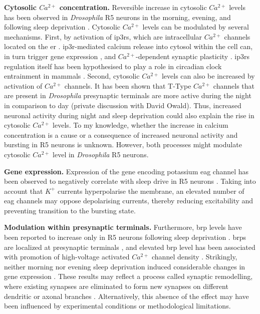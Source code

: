 \documentclass[../main.tex]{subfiles}
\begin{document}
\textbf{Cytosolic $Ca^{2+}$ concentration.}
Reversible increase in cytosolic $Ca^{2+}$ levels has been observed in \textit{Drosophila} R5 neurons in the morning, evening, and following sleep deprivation \cite{andreaniCircadianProgrammingEllipsoid2022,liuSleepDriveEncoded2016}. Cytosolic $Ca^{2+}$ levels can be modulated by several mechanisms. First, by activation of \glspl{ip3r}, which are intracellular $Ca^{2+}$ channels located on the \gls{er} \cite{schmitzStructuralBasisActivation2022}. \gls{ip3r}-mediated calcium release into cytosol within the cell can, in turn trigger gene expression \cite{schmitzStructuralBasisActivation2022}, and $Ca^{2+}$-dependent synaptic plasticity \cite{liuSleepDriveEncoded2016}. \glspl{ip3r} regulation itself has been hypothesised to play a role in circadian clock entrainment in mammals \cite{hamadaRoleInositolTrisphosphateinduced1999}. Second, cytosolic $Ca^{2+}$ levels can also be increased by activation of $Ca^{2+}$ channels. It has been shown that T-Type $Ca^{2+}$ channels that are present in \textit{Drosophila} presynaptic terminals are more active during the night in comparison to day (private discussion with David Owald).
Thus, increased neuronal activity during night and sleep deprivation could also explain the rise in cytosolic $Ca^{2+}$ levels. To my knowledge, whether the increase in calcium concentration is a cause or a consequence of increased neuronal activity and bursting in R5 neurons is unknown. However, both processes might modulate cytosolic $Ca^{2+}$ level in \textit{Drosophila} R5 neurons.

\textbf{Gene expression.}
Expression of the gene encoding potassium \gls{eag} channel has been observed to negatively correlate with sleep drive in R5 neurons \cite{doppSinglecellTranscriptomicsReveals2024}. Taking into account that $K^{+}$ currents hyperpolarise the membrane, an elevated number of \gls{eag} channels may oppose depolarising currents, thereby reducing excitability and preventing transition to the bursting state.

\textbf{Modulation within presynaptic terminals.}
Furthermore, \gls{brp} levels have been reported to increase only in R5 neurons following sleep deprivation \cite{liuSleepDriveEncoded2016}. \glspl{brp} are localized at presynaptic terminals \cite{waghBruchpilotProteinHomology2006}, and elevated \gls{brp} level has been associated with promotion of high-voltage activated $Ca^{2+}$ channel density \cite{kittelBruchpilotPromotesActive2006}. Strikingly, neither morning nor evening sleep deprivation induced considerable changes in gene expression \cite{andreaniCircadianProgrammingEllipsoid2022}. These results may reflect a process called synaptic remodelling, where existing synapses are eliminated to form new synapses on different dendritic or axonal branches \cite{kurupNeuralCircuitRewiring2016}. Alternatively, this absence of the effect may have been influenced by experimental conditions or methodological limitations.
\end{document}
